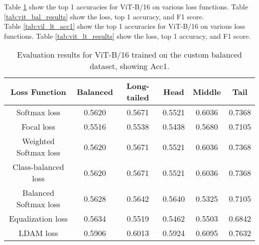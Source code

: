 Table \ref{tab:vit_bal_acc1} show the top 1 accuracies for ViT-B/16 on various loss functions. Table \ref{tab:vit_bal_results} show the loss, top 1 accuracy, and F1 score.\\

Table \ref{tab:vil_lt_acc1} show the top 1 accuracies for ViT-B/16 on various loss functions. Table \ref{tab:vit_lt_results} show the loss, top 1 accuracy, and F1 score.

\begin{table}[H]
    \centering
    \begin{tabular}{cccccc}
        \toprule
        Loss Function & Balanced & Long-tailed & Head & Middle & Tail \\ 
        \midrule
        Softmax loss   & 0.5620 & 0.5671 & 0.5521 & 0.6036 & 0.7368 \\
        Focal loss   & 0.5516 & 0.5538 & 0.5438 & 0.5680 & 0.7105 \\
        Weighted Softmax loss   & 0.5620 & 0.5671 & 0.5521 & 0.6036 & 0.7368 \\
        Class-balanced loss   & 0.5620 & 0.5671 &  0.5521 & 0.6036 & 0.7368 \\
        Balanced Softmax loss   & 0.5628 & 0.5642 & 0.5640 & 0.5325 & 0.7105 \\
        Equalization loss   & 0.5634   & 0.5519 & 0.5462 & 0.5503 & 0.6842 \\
        LDAM loss   & 0.5906 &  0.6013 & 0.5924 & 0.6095 & 0.7632 \\
        \bottomrule
    \end{tabular}
    \caption{Evaluation results for ViT-B/16 trained on the custom balanced dataset, showing Acc1.}
    \label{tab:vit_bal_acc1}
\end{table}

